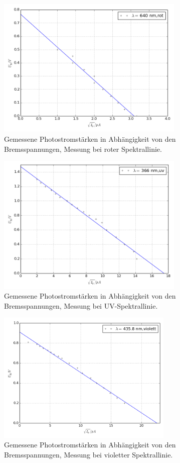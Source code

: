 \begin{figure}[p]
	\centering
	\includegraphics[width=0.8\textwidth]{Bilder/Fit_rot.png}
	\caption{Gemessene Photostromstärken in Abhängigkeit von den Bremsspannungen, Messung bei roter Spektrallinie.}
\end{figure}
\begin{figure}[p]
	\centering
	\includegraphics[width=0.8\textwidth]{Bilder/Fit_uv.png}
	\caption{Gemessene Photostromstärken in Abhängigkeit von den Bremsspannungen, Messung bei UV-Spektrallinie.}
\end{figure}
\begin{figure}[pt]
	\centering
	\includegraphics[width=0.75\textwidth]{Bilder/Fit_violett.png}
	\caption{Gemessene Photostromstärken in Abhängigkeit von den Bremsspannungen, Messung bei violetter Spektrallinie.}
	\label{fig:uidiagramm2}
\end{figure}
